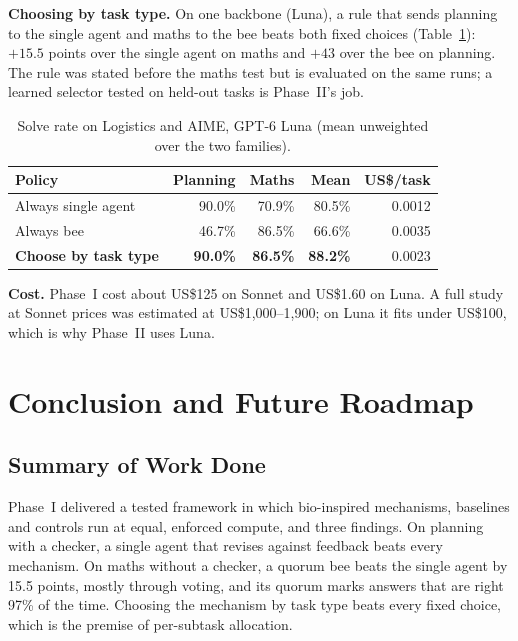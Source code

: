 \documentclass[12pt,a4paper]{article}
\newcommand{\head}[1]{\textbf{#1}}
\newcommand{\runin}[1]{\textbf{#1}\quad}
\begin{document}
\runin{Choosing by task type.} On one backbone (Luna), a rule that sends planning to the single agent and
maths to the bee beats both fixed choices (Table~\ref{tab:bytype}): $+15.5$ points over the single agent
on maths and $+43$ over the bee on planning. The rule was stated before the maths test but is evaluated
on the same runs; a learned selector tested on held-out tasks is Phase~II's job.

\begin{table}[H]
\centering\footnotesize
\caption{Solve rate on Logistics and AIME, GPT-6 Luna (mean unweighted over the two families).}
\label{tab:bytype}
\begin{tabular}{@{}lrrrr@{}}
\toprule
\head{Policy} & \head{Planning} & \head{Maths} & \head{Mean} & \head{US\$/task} \\
\midrule
Always single agent & 90.0\% & 70.9\% & 80.5\% & 0.0012 \\
Always bee & 46.7\% & 86.5\% & 66.6\% & 0.0035 \\
\textbf{Choose by task type} & \textbf{90.0\%} & \textbf{86.5\%} & \textbf{88.2\%} & 0.0023 \\
\bottomrule
\end{tabular}
\end{table}

\runin{Cost.} Phase~I cost about US\$125 on Sonnet and US\$1.60 on Luna. A full study at Sonnet prices
was estimated at US\$1,000--1,900; on Luna it fits under US\$100, which is why Phase~II uses Luna.

\section{Conclusion and Future Roadmap}
\label{sec:conclusion}

\subsection{Summary of Work Done}
Phase~I delivered a tested framework in which bio-inspired mechanisms, baselines and controls run at
equal, enforced compute, and three findings. On planning with a checker, a single agent that revises
against feedback beats every mechanism. On maths without a checker, a quorum bee beats the single agent
by 15.5 points, mostly through voting, and its quorum marks answers that are right 97\% of the time.
Choosing the mechanism by task type beats every fixed choice, which is the premise of per-subtask
allocation.
\end{document}
